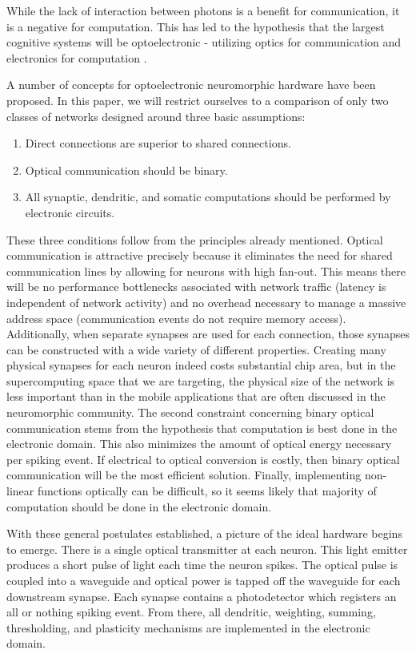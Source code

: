 \documentclass{article}
\begin{document}
While the lack of interaction between photons is a benefit for communication, it is a negative for computation. This has led to the hypothesis that the largest cognitive systems will be optoelectronic - utilizing optics for communication and electronics for computation \cite{shainline2018largest}.

A number of concepts for optoelectronic neuromorphic hardware have been proposed. In this paper, we will restrict ourselves to a comparison of only two classes of networks designed around three basic assumptions:

\begin{enumerate}
    \item Direct connections are superior to shared connections.
    \item Optical communication should be binary.
    \item All synaptic, dendritic, and somatic computations should be performed by electronic circuits.
\end{enumerate}

These three conditions follow from the principles already mentioned. Optical communication is attractive precisely because it eliminates the need for shared communication lines by allowing for neurons with high fan-out. This means there will be no performance bottlenecks associated with network traffic (latency is independent of network activity) and no overhead necessary to manage a massive address space (communication events do not require memory access). Additionally, when separate synapses are used for each connection, those synapses can be constructed with a wide variety of different properties. Creating many physical synapses for each neuron indeed costs substantial chip area, but in the supercomputing space that we are targeting, the physical size of the network is less important than in the mobile applications that are often discussed in the neuromorphic community. The second constraint concerning binary optical communication stems from the hypothesis that computation is best done in the electronic domain. This also minimizes the amount of optical energy necessary per spiking event. If electrical to optical conversion is costly, then binary optical communication will be the most efficient solution. Finally, implementing non-linear functions optically can be difficult, so it seems likely that majority of computation should be done in the electronic domain.

With these general postulates established, a picture of the ideal hardware begins to emerge. There is a single optical transmitter at each neuron. This light emitter produces a short pulse of light each time the neuron spikes. The optical pulse is coupled into a waveguide and optical power is tapped off the waveguide for each downstream synapse. Each synapse contains a photodetector which registers an all or nothing spiking event. From there, all dendritic, weighting, summing, thresholding, and plasticity mechanisms are implemented in the electronic domain. 
\end{document}
